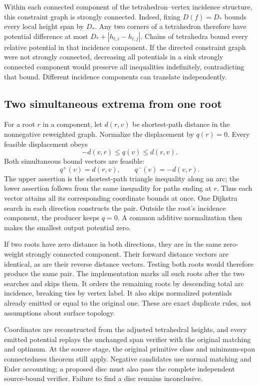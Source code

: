 Within each connected component of the tetrahedron--vertex incidence
structure, this constraint graph is strongly connected. Indeed, fixing
$D(f)=D_*$ bounds every local height span by $D_*$. Any two corners of a
tetrahedron therefore have potential difference at most
$D_*+|h_{t,i}-h_{t,j}|$. Chains of tetrahedra bound every relative potential
in that incidence component. If the directed constraint graph were not
strongly connected, decreasing all potentials in a sink strongly connected
component would preserve all inequalities indefinitely, contradicting that
bound. Different incidence components can translate independently.

\subsection{Two simultaneous extrema from one root}

For a root $r$ in a component, let $d(r,v)$ be shortest-path distance in
the nonnegative reweighted graph. Normalize the displacement by $q(r)=0$.
Every feasible displacement obeys
\[
 -d(v,r)\leq q(v)\leq d(r,v).
\]
Both simultaneous bound vectors are feasible:
\[
 q^+(v)=d(r,v),\qquad q^-(v)=-d(v,r).
\]
The upper assertion is the shortest-path triangle inequality along an arc;
the lower assertion follows from the same inequality for paths ending at
$r$. Thus each vector attains all its corresponding coordinate bounds at
once. One Dijkstra search in each direction constructs the pair. Outside
the root's incidence component, the producer keeps $q=0$. A common additive
normalization then makes the smallest output potential zero.

If two roots have zero distance in both directions, they are in the same
zero-weight strongly connected component. Their forward distance vectors
are identical, as are their reverse distance vectors. Testing both roots
would therefore produce the same pair. The implementation marks all such
roots after the two searches and skips them. It orders the remaining roots
by descending total arc incidence, breaking ties by vertex label. It also
skips normalized potentials already emitted or equal to the original one.
These are exact duplicate rules, not assumptions about surface topology.

Coordinates are reconstructed from the adjusted tetrahedral heights, and
every emitted potential replays the unchanged span verifier with the
original matching and optimum. At the source stage, the original primitive
class and minimum-span connectedness theorem still apply. Negative
candidates use normal matching and Euler accounting; a proposed disc must
also pass the complete independent source-bound verifier. Failure to find
a disc remains inconclusive.

